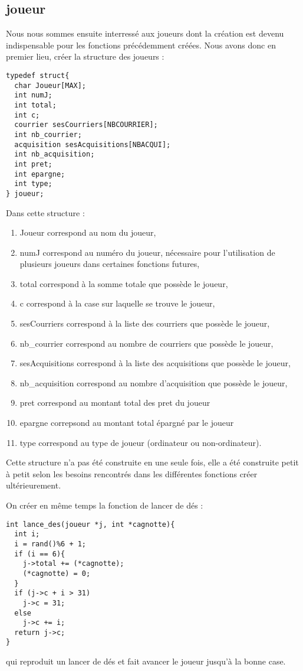 \documentclass[a4paper, 11pt]{report}
\begin{document}
\subsection{joueur}
Nous nous sommes ensuite interressé aux joueurs dont la création est devenu indispensable pour les fonctions précédemment créées.
Nous avons donc en premier lieu, créer la structure des joueurs :
\begin{verbatim}
typedef struct{
  char Joueur[MAX];
  int numJ;
  int total;
  int c;
  courrier sesCourriers[NBCOURRIER];
  int nb_courrier;
  acquisition sesAcquisitions[NBACQUI];
  int nb_acquisition;
  int pret;
  int epargne;
  int type;
} joueur;
\end{verbatim}
Dans cette structure :
\begin{enumerate}
\item Joueur correspond au nom du joueur,
\item numJ correspond au numéro du joueur, nécessaire pour l'utilisation de plusieurs joueurs dans certaines fonctions futures,
\item total correspond à la somme totale que possède le joueur,
\item c correspond à la case sur laquelle se trouve le joueur,
\item sesCourriers correspond à la liste des courriers que possède le joueur,
\item nb\_courrier correspond au nombre de courriers que possède le joueur,
\item sesAcquisitions correspond à la liste des acquisitions que possède le joueur,
\item nb\_acquisition correspond au nombre d'acquisition que possède le joueur,
\item pret correspond au montant total des pret du joueur
\item epargne correpsond au montant total épargné par le joueur
\item type correspond au type de joueur (ordinateur ou non-ordinateur).
\end{enumerate}
Cette structure n'a pas été construite en une seule fois, elle a été construite petit à petit selon les besoins rencontrés dans les différentes fonctions créer ultérieurement.

On créer en même temps la fonction de lancer de dés :
\begin{verbatim}
int lance_des(joueur *j, int *cagnotte){
  int i;
  i = rand()%6 + 1;
  if (i == 6){
    j->total += (*cagnotte);
    (*cagnotte) = 0;
  }
  if (j->c + i > 31)
    j->c = 31;
  else
    j->c += i;
  return j->c;
}
\end{verbatim}
qui reproduit un lancer de dés et fait avancer le joueur jusqu'à la bonne case.
\end{document}
